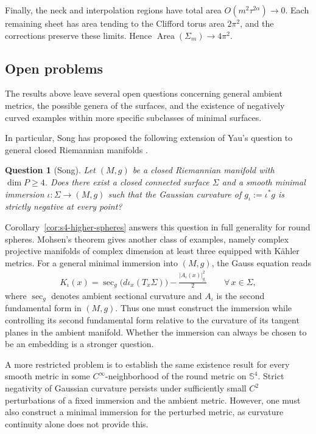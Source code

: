 \documentclass[a4paper,11pt,oneside,reqno]{amsart}
\numberwithin{equation}{section}
\newtheorem*{question}{Question}
\theoremstyle{definition}
\begin{document}
Finally, the neck and interpolation regions have
total area $O(m^2\tau^{2\alpha})\to0$.
Each remaining sheet has area tending to the
Clifford torus area $2\pi^2$, and the corrections
preserve these limits. Hence
$\operatorname{Area}(\Sigma_m)\to4\pi^2$.

\subsection{Open problems}
\label{subsec:s4-open-problems}

The results above leave several open questions concerning general ambient metrics, the possible genera of the surfaces, and the existence of negatively curved examples within more specific subclasses of minimal surfaces.

In particular, Song has proposed the following extension of Yau's question
to general closed Riemannian manifolds
\cite[p.~4]{SongQuestions}.

\begin{question}[Song]
    \label{que:s4-general-ambient}
    Let $(M,g)$ be a closed Riemannian manifold with
    $\dim P\geq4$. Does there exist a closed connected
    surface $\Sigma$ and a smooth minimal immersion
    $\iota:\Sigma\to(M,g)$ such that the Gaussian
    curvature of $g_\iota:=\iota^*g$ is strictly
    negative at every point?
\end{question}
%
Corollary~\ref{cor:s4-higher-spheres} answers this question in full generality for round spheres. Mohsen's theorem gives another class of examples, namely complex projective manifolds of complex dimension at least three equipped with K\"ahler metrics. For a general minimal immersion into $(M,g)$, the Gauss
equation reads
%
\begin{align*}
    K_\iota(x)
    =\sec_g\bigl(d\iota_x(T_x\Sigma)\bigr)
    -\frac{|A_\iota(x)|_{g_\iota}^2}{2}
    \qquad\forall\,x\in\Sigma,
\end{align*}
%
where $\sec_g$ denotes ambient sectional curvature and
$A_\iota$ is the second fundamental form in $(M,g)$.
Thus one must construct the immersion while controlling
its second fundamental form relative to the curvature
of its tangent planes in the ambient manifold.
Whether the immersion can always be chosen to be an
embedding is a stronger question.

A more restricted problem is to establish the same
existence result for every smooth metric in some
$C^\infty$-neighborhood of the round metric on
$\mathbb{S}^4$. Strict negativity of Gaussian curvature
persists under sufficiently small $C^2$ perturbations
of a fixed immersion and the ambient metric. However,
one must also construct a minimal immersion for the
perturbed metric, as curvature continuity alone does not
provide this.
\end{document}
